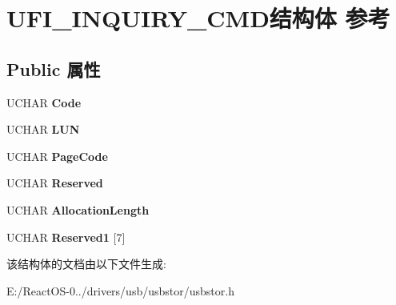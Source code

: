 \hypertarget{struct_u_f_i___i_n_q_u_i_r_y___c_m_d}{}\section{U\+F\+I\+\_\+\+I\+N\+Q\+U\+I\+R\+Y\+\_\+\+C\+M\+D结构体 参考}
\label{struct_u_f_i___i_n_q_u_i_r_y___c_m_d}
\subsection*{Public 属性}
\begin{DoxyCompactItemize}
\item 
\mbox{\label{struct_u_f_i___i_n_q_u_i_r_y___c_m_d_a33ce5ba629ac68f5ec76cd17576e657c}} 
U\+C\+H\+AR {\bfseries Code}
\item 
\mbox{\label{struct_u_f_i___i_n_q_u_i_r_y___c_m_d_aad895a116c5cfe1901f7496299801edc}} 
U\+C\+H\+AR {\bfseries L\+UN}
\item 
\mbox{\label{struct_u_f_i___i_n_q_u_i_r_y___c_m_d_ae2d9fbeda56a749e41b1a37415353ed2}} 
U\+C\+H\+AR {\bfseries Page\+Code}
\item 
\mbox{\label{struct_u_f_i___i_n_q_u_i_r_y___c_m_d_ae54d2fcb5724f0b8e0486b7817547086}} 
U\+C\+H\+AR {\bfseries Reserved}
\item 
\mbox{\label{struct_u_f_i___i_n_q_u_i_r_y___c_m_d_ae243d104af8b34c8380bb5a3732b2877}} 
U\+C\+H\+AR {\bfseries Allocation\+Length}
\item 
\mbox{\label{struct_u_f_i___i_n_q_u_i_r_y___c_m_d_a4867548877bcd328b1aeac7a588ff5bb}} 
U\+C\+H\+AR {\bfseries Reserved1} \mbox{[}7\mbox{]}
\end{DoxyCompactItemize}


该结构体的文档由以下文件生成\+:\begin{DoxyCompactItemize}
\item 
E\+:/\+React\+O\+S-\/0../drivers/usb/usbstor/usbstor.\+h\end{DoxyCompactItemize}
